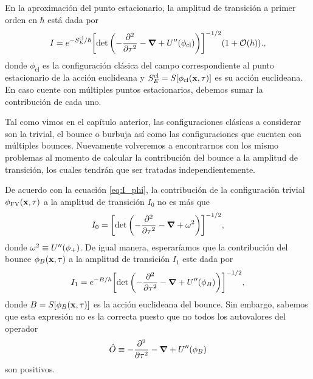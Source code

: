 En la aproximación del punto estacionario, la amplitud de transición a primer orden en $\hbar$ está dada por
\begin{equation} \label{eq:I_phi}
I = e^{-S_E^{\textrm{cl}} / \hbar} \qty[ \det\left(-\pdv[2]{\tau} -\grad{} + U''\qty(\phi_{\textrm{cl}}) \right) ]^{-1/2} \qty(1 + \order{\hbar}).,
\end{equation}
donde $\phi_{\textrm{cl}}$ es la configuración clásica del campo correspondiente al punto estacionario de la acción euclideana y $S_E^{\textrm{cl}} = S[\phi_{\textrm{cl}}\qty(\vb{x}, \tau)]$ es su acción euclideana. En caso cuente con múltiples puntos estacionarios, debemos sumar la contribución de cada uno. 

Tal como vimos en el capítulo 
anterior, las configuraciones clásicas a considerar son la trivial, el bounce o burbuja así como las configuraciones que cuenten con múltiples bounces. Nuevamente volveremos a encontrarnos con los mismo problemas al momento de calcular la contribución del bounce a la amplitud de transición, los cuales tendrán que ser tratadas independientemente. 

De acuerdo con la ecuación \eqref{eq:I_phi}, la contribución de la configuración trivial $\phi_{\text{FV}}\qty(\vb{x}, \tau)$ a la amplitud de transición $I_0$ no es más que
\begin{equation}
	I_0 = \qty[ \det\qty(-\pdv[2]{\tau} -\grad{} + \omega^2) ]^{-1/2},
\end{equation}
donde $\omega^2 \equiv U''\qty(\phi_+)$. De igual manera, esperaríamos que la contribución del bounce $\phi_B\qty(\vb{x}, \tau)$ a la amplitud de transición $I_1$ este dada por 
\begin{equation}
I_1 = e^{-B / \hbar} \qty[ \det\qty(-\pdv[2]{\tau} -\grad{} + U''\qty(\phi_B) ) ]^{-1/2},
\end{equation}
donde $B = S[\phi_B\qty(\vb{x}, \tau)]$ es la acción euclideana del bounce. Sin embargo, sabemos que esta expresión no es la correcta puesto que no todos los autovalores del operador
\begin{equation}
	\hat{O} \equiv -\pdv[2]{\tau} -\grad{} + U''\qty(\phi_B)
\end{equation}
son positivos. 

